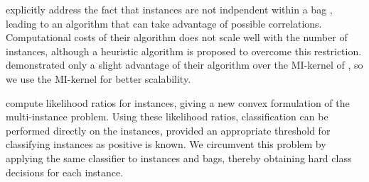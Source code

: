 \citet{zhou2009multi} explicitly address the fact that instances are not
indpendent within a bag , leading to an algorithm that can take advantage of
possible correlations. Computational costs of their algorithm does not scale
well with the number of instances, although a heuristic algorithm is proposed
to overcome this restriction. 
\citet{zhou2009multi} demonstrated only a slight
advantage of their algorithm over the MI-kernel of \citet{gaertner2002multi},
so we use the MI-kernel for better scalability.

\citet{liconvex2010} compute likelihood ratios for instances, giving a new
convex formulation of the multi-instance problem.  Using these likelihood
ratios, classification can be performed directly on the instances, provided an
appropriate threshold for classifying instances as positive is known. We
circumvent this problem by applying the same classifier to instances and bags,
thereby obtaining hard class decisions for each instance.



